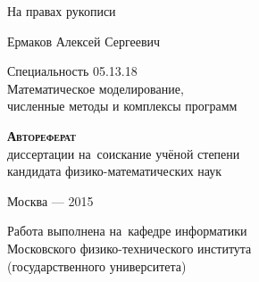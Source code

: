 \documentclass[a4paper,14pt]{extarticle}
\numberwithin{equation}{section}
\begin{document}

    \begin{titlepage}
        \begin{flushright}
            На правах рукописи
        \end{flushright}

        \vspace{6em}

        \begin{center}
            Ермаков Алексей Сергеевич
        \end{center}

        \vspace{4em}

        \begin{center}
            \textsc{\textbf{\disser}}
        \end{center}

        \vspace{4em}

        \begin{center}
            Специальность 05.13.18\\
            Математическое моделирование,\\
            численные методы и комплексы программ
        \end{center}

        \vspace{1.5em}

        \begin{center}
        \textsc{
            \textbf{Автореферат}}\\
            диссертации на~соискание учёной степени\\
            кандидата физико-математических наук
        \end{center}

        \vspace{\fill}

        \begin{center}
            Москва --- 2015
        \end{center}
    \end{titlepage}

    \newpage

    \noindent
    Работа выполнена на~кафедре информатики\\
    Московского физико-технического института\\
    (государственного университета)\\
\end{document}
